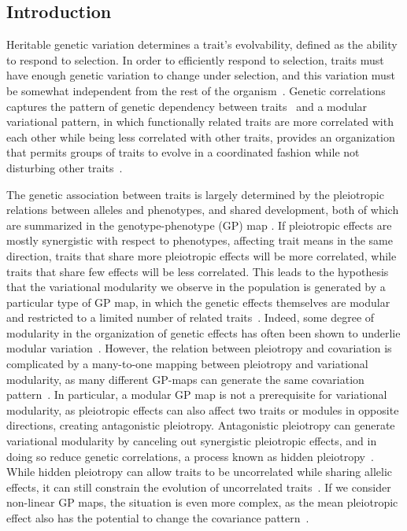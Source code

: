 \begin{refsection}


\section{Introduction}

Heritable genetic variation determines a trait's evolvability, defined as the
ability to respond to selection. In order to efficiently respond to selection,
traits must have enough genetic variation to change under selection, and this
variation must be somewhat independent from the rest of the
organism~\parencite{Lewontin1979-iw}. Genetic correlations captures the
pattern of genetic dependency between traits~\parencite{Lande1979-by,
Lande1983-ez} and a modular variational pattern, in which functionally related
traits are more correlated with each other while being less correlated with other traits,
provides an organization that permits groups of traits to evolve in a
coordinated fashion while not disturbing other traits~\parencite{Olson1958-qk,
Cheverud1996-jw, Wagner2007-cx, Melo2016-yw}.

The genetic association between traits is largely determined by the
pleiotropic relations between alleles and phenotypes, and shared development,
both of which are summarized in the genotype-phenotype (GP) map . If
pleiotropic effects are mostly synergistic with respect to phenotypes,
affecting trait means in the same direction, traits that share more
pleiotropic effects will be more correlated, while traits that share few
effects will be less correlated. This leads to the hypothesis that the
variational modularity we observe in the population is generated by a
particular type of GP map, in which the genetic effects themselves are modular
and restricted to a limited number of related
traits~\parencite{Wagner1996-ui}. Indeed, some degree of modularity in the
organization of genetic effects has often been shown to underlie modular
variation~\parencite{Cheverud1997-rw, Mezey2000-rs, Kenney-Hunt2008-bd,
Porto2016-qc, Leamy1999-dm}. However, the relation between pleiotropy and
covariation is complicated by a many-to-one mapping between pleiotropy and
variational modularity, as many different GP-maps can generate the same
covariation pattern~\parencite{Mitteroecker2009-jb}. In particular, a modular
GP map is not a prerequisite for variational modularity, as pleiotropic
effects can also affect two traits or modules in opposite directions, creating
antagonistic pleiotropy. Antagonistic pleiotropy can generate variational
modularity by canceling out synergistic pleiotropic effects, and in doing so
reduce genetic correlations, a process known as hidden
pleiotropy~\parencite{Turelli1985-ne, Pavlicev2011-xm}. While hidden
pleiotropy can allow traits to be uncorrelated while sharing allelic effects,
it can still constrain the evolution of uncorrelated
traits~\parencite{Baatz1997-hh}. If we consider non-linear GP maps, the
situation is even more complex, as the mean pleiotropic effect also has the
potential to change the covariance pattern~\parencite{Mitteroecker2009-jb}.


\end{refsection}

